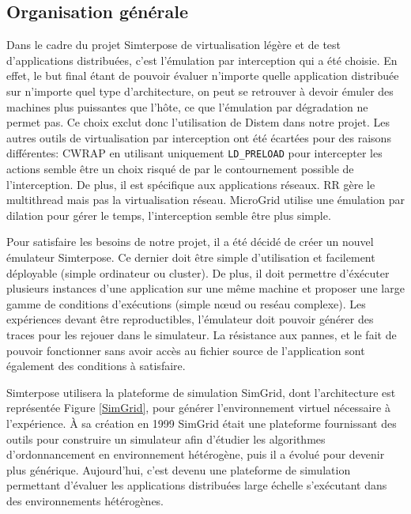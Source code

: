 \subsection{Organisation générale}

Dans le cadre du projet Simterpose de virtualisation légère et de test
d'applications distribuées, c'est l'émulation par interception qui a été
choisie. En effet, le but final étant de pouvoir évaluer n'importe quelle
application distribuée sur n'importe quel type d'architecture, on peut se
retrouver à devoir émuler des machines plus puissantes que l'hôte, ce que
l'émulation par dégradation ne permet pas. Ce choix exclut donc l'utilisation de
Distem dans notre projet. Les autres outils de virtualisation par interception
ont été écartées pour des raisons différentes: CWRAP en utilisant uniquement
\texttt{LD\_PRELOAD} pour intercepter les actions semble être un choix risqué de
par le contournement possible de l'interception. De plus, il est spécifique aux
applications réseaux. RR gère le multithread mais pas la virtualisation réseau. MicroGrid utilise une émulation par dilation pour gérer le temps, l'interception semble être plus simple.

Pour satisfaire les besoins de notre projet, il a été décidé de créer un nouvel
émulateur Simterpose. Ce dernier doit être simple d'utilisation et facilement
déployable (simple ordinateur ou cluster).  De plus, il doit permettre
d'éxécuter plusieurs instances d'une application sur une même machine et
proposer une large gamme de conditions d'exécutions (simple n\oe ud ou reséau
complexe). Les expériences devant être reproductibles, l'émulateur doit pouvoir
générer des traces pour les rejouer dans le simulateur. La résistance aux
pannes, et le fait de pouvoir fonctionner sans avoir accès au fichier source de
l'application sont également des conditions à satisfaire.

Simterpose utilisera la plateforme de simulation SimGrid, dont l'architecture
est représentée Figure \ref{SimGrid}, pour générer l'environnement virtuel
nécessaire à l'expérience. À sa création en 1999 SimGrid
\citep{CASANOVA:SimGrid} était une plateforme fournissant des outils pour
construire un simulateur afin d'étudier les algorithmes d'ordonnancement en
environnement hétérogène, puis il a évolué \citep{MARTIN:SimGrid} pour devenir
plus générique. Aujourd'hui, c'est devenu une plateforme de simulation
permettant d'évaluer les applications distribuées large échelle s'exécutant dans
des environnements hétérogènes.
 
